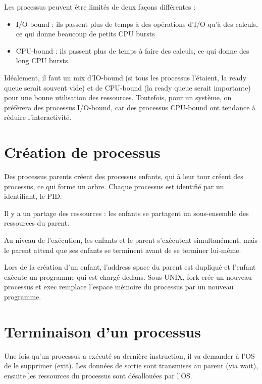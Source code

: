 Les processus peuvent être limités de deux façons différentes :

\begin{itemize}
	\item I/O-bound : ils passent plus de temps à des opérations d'I/O qu'à des calculs, ce qui donne beaucoup de petits CPU bursts
	\item CPU-bound : ils passent plus de temps à faire des calculs, ce qui donne des long CPU bursts.
\end{itemize}

Idéalement, il faut un mix d'IO-bound (si tous les processus l'étaient, la ready queue serait souvent vide) et de CPU-bound (la ready queue serait importante) pour une bonne utilisation des ressources. Toutefois, pour un système, on préfèrera des processus I/O-bound, car des processus CPU-bound ont tendance à réduire l'interactivité.


\section{Création de processus}

Des processus parents créent des processus enfants, qui à leur tour créent des processus, ce qui forme un arbre. Chaque processus est identifié par un identifiant, le PID.

Il y a un partage des ressources : les enfants se partagent un sous-ensemble des ressources du parent.


Au niveau de l'exécution, les enfants et le parent s'exécutent simultanément, mais le parent attend que ses enfants se terminent avant de se terminer lui-même.

Lors de la création d'un enfant, l'address space du parent est dupliqué et l'enfant exécute un programme qui est chargé dedans. Sous UNIX, fork crée un nouveau processus et exec remplace l'espace mémoire du processus par un nouveau programme.


\section{Terminaison d'un processus}

Une fois qu'un processus a exécuté sa dernière instruction, il va demander à l'OS de le supprimer (exit). Les données de sortie sont transmises au parent (via wait), ensuite les ressources du processus sont désallouées par l'OS.

